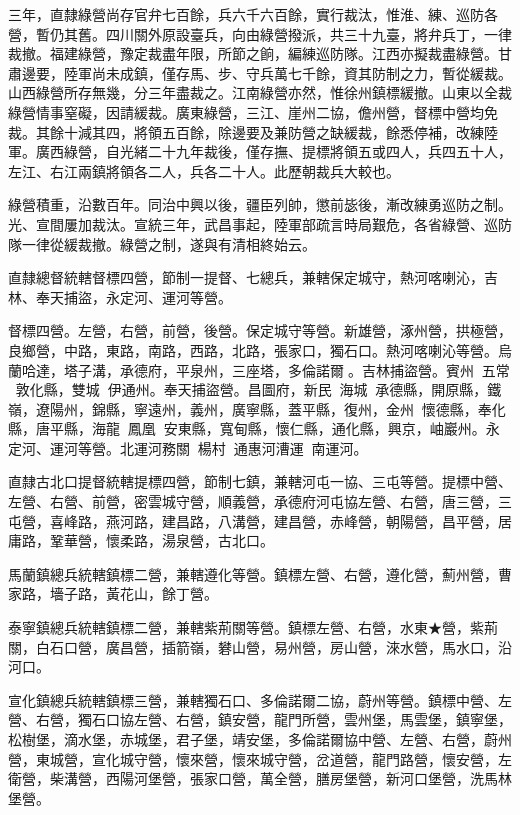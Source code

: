 \begin{pinyinscope}
三年，直隸綠營尚存官弁七百餘，兵六千六百餘，實行裁汰，惟淮、練、巡防各營，暫仍其舊。四川關外原設臺兵，向由綠營撥派，共三十九臺，將弁兵丁，一律裁撤。福建綠營，豫定裁盡年限，所節之餉，編練巡防隊。江西亦擬裁盡綠營。甘肅邊要，陸軍尚未成鎮，僅存馬、步、守兵萬七千餘，資其防制之力，暫從緩裁。山西綠營所存無幾，分三年盡裁之。江南綠營亦然，惟徐州鎮標緩撤。山東以全裁綠營情事窒礙，因請緩裁。廣東綠營，三江、崖州二協，儋州營，督標中營均免裁。其餘十減其四，將領五百餘，除邊要及兼防營之缺緩裁，餘悉停補，改練陸軍。廣西綠營，自光緒二十九年裁後，僅存撫、提標將領五或四人，兵四五十人，左江、右江兩鎮將領各二人，兵各二十人。此歷朝裁兵大較也。

綠營積重，沿數百年。同治中興以後，疆臣列帥，懲前毖後，漸改練勇巡防之制。光、宣間屢加裁汰。宣統三年，武昌事起，陸軍部疏言時局艱危，各省綠營、巡防隊一律從緩裁撤。綠營之制，遂與有清相終始云。

直隸總督統轄督標四營，節制一提督、七總兵，兼轄保定城守，熱河喀喇沁，吉林、奉天捕盜，永定河、運河等營。

督標四營。左營，右營，前營，後營。保定城守等營。新雄營，涿州營，拱極營，良鄉營，中路，東路，南路，西路，北路，張家口，獨石口。熱河喀喇沁等營。烏蘭哈達，塔子溝，承德府，平泉州，三座塔，多倫諾爾。吉林捕盜營。賓州，五常，敦化縣，雙城，伊通州。奉天捕盜營。昌圖府，新民，海城，承德縣，開原縣，鐵嶺，遼陽州，錦縣，寧遠州，義州，廣寧縣，蓋平縣，復州，金州，懷德縣，奉化縣，唐平縣，海龍，鳳凰，安東縣，寬甸縣，懷仁縣，通化縣，興京，岫巖州。永定河、運河等營。北運河務關，楊村，通惠河漕運，南運河。

直隸古北口提督統轄提標四營，節制七鎮，兼轄河屯一協、三屯等營。提標中營、左營、右營、前營，密雲城守營，順義營，承德府河屯協左營、右營，唐三營，三屯營，喜峰路，燕河路，建昌路，八溝營，建昌營，赤峰營，朝陽營，昌平營，居庸路，鞏華營，懷柔路，湯泉營，古北口。

馬蘭鎮總兵統轄鎮標二營，兼轄遵化等營。鎮標左營、右營，遵化營，薊州營，曹家路，墻子路，黃花山，餘丁營。

泰寧鎮總兵統轄鎮標二營，兼轄紫荊關等營。鎮標左營、右營，水東★營，紫荊關，白石口營，廣昌營，插箭嶺，礬山營，易州營，房山營，淶水營，馬水口，沿河口。

宣化鎮總兵統轄鎮標三營，兼轄獨石口、多倫諾爾二協，蔚州等營。鎮標中營、左營、右營，獨石口協左營、右營，鎮安營，龍門所營，雲州堡，馬雲堡，鎮寧堡，松樹堡，滴水堡，赤城堡，君子堡，靖安堡，多倫諾爾協中營、左營、右營，蔚州營，東城營，宣化城守營，懷來營，懷來城守營，岔道營，龍門路營，懷安營，左衛營，柴溝營，西陽河堡營，張家口營，萬全營，膳房堡營，新河口堡營，洗馬林堡營。


\end{pinyinscope}
